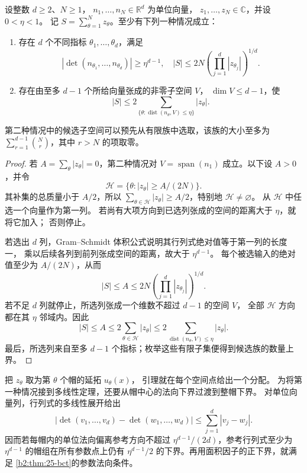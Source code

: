 \begin{lemma}[有限帽的方向分配]\label{b2:lem:25-finite-cap-allocation}
设整数 \(d\geq2\)、\(N\geq1\)，
\(n_1,\ldots,n_N\in\mathbb R^d\) 为单位向量，
\(z_1,\ldots,z_N\in\mathbb C\)，并设 \(0<\eta<1\)。
记 \(S=\sum_{\theta=1}^Nz_\theta\)。至少有下列一种情况成立：
\begin{enumerate}
\item\label{b2:item:25-cap-transverse}存在 \(d\) 个不同指标 \(\theta_1,\ldots,\theta_d\)，满足
\[
 |\det(n_{\theta_1},\ldots,n_{\theta_d})|
 \geq\eta^{d-1},\quad
 |S|\leq2N
 \left(\prod_{j=1}^d|z_{\theta_j}|\right)^{1/d}.
\]
\item\label{b2:item:25-cap-cluster}存在由至多 \(d-1\) 个所给向量张成的非零子空间 \(V\)，
\(\dim V\leq d-1\)，使
\[
 |S|\leq
 2\sum_{\{\theta:\operatorname{dist}(n_\theta,V)\leq\eta\}}
 |z_\theta|.
\]
\end{enumerate}
第二种情况中的候选子空间可以预先从有限族中选取，该族的大小至多为
\(\sum_{r=1}^{d-1}\binom Nr\)，其中 \(r>N\) 的项取零。
\end{lemma}
\begin{proof}
若 \(A=\sum_\theta|z_\theta|=0\)，第二种情况对
\(V=\operatorname{span}(n_1)\) 成立。以下设 \(A>0\)，并令
\[
 \mathcal H=\{\theta:|z_\theta|\geq A/(2N)\}.
\]
其补集的总质量小于 \(A/2\)，所以
\(\sum_{\theta\in\mathcal H}|z_\theta|\geq A/2\)，特别地
\(\mathcal H\ne\varnothing\)。
从 \(\mathcal H\) 中任选一个向量作为第一列。
若尚有大项方向到已选列张成的空间的距离大于 \(\eta\)，就将它加入；
否则停止。

若选出 \(d\) 列，Gram--Schmidt 体积公式说明其行列式绝对值等于第一列的长度一，
乘以后续各列到前列张成空间的距离，故大于 \(\eta^{d-1}\)。
每个被选输入的绝对值至少为 \(A/(2N)\)，从而
\[
 |S|\leq A
 \leq2N\left(\prod_{j=1}^d|z_{\theta_j}|\right)^{1/d}.
\]
若不足 \(d\) 列就停止，所选列张成一个维数不超过 \(d-1\) 的空间 \(V\)，
全部 \(\mathcal H\) 方向都在其 \(\eta\) 邻域内。因此
\[
 |S|\leq A\leq
 2\sum_{\theta\in\mathcal H}|z_\theta|
 \leq2\sum_{\operatorname{dist}(n_\theta,V)\leq\eta}|z_\theta|.
\]
最后，所选列来自至多 \(d-1\) 个指标；枚举这些有限子集便得到候选族的数量上界。
\end{proof}

把 \(z_\theta\) 取为第 \(\theta\) 个帽的延拓 \(u_\theta(x)\)，
引理就在每个空间点给出一个分配。
为将第一种情况接到多线性定理，还要从帽中心的法向下界过渡到整帽下界。
对单位向量列，行列式的多线性展开给出
\[
 |\det(v_1,\ldots,v_d)-\det(w_1,\ldots,w_d)|
 \leq\sum_{j=1}^d|v_j-w_j|.
\]
因而若每帽内的单位法向偏离参考方向不超过
\(\eta^{d-1}/(2d)\)，参考行列式至少为 \(\eta^{d-1}\) 的帽组在所有参数点上仍有
\(\eta^{d-1}/2\) 的下界。再用面积因子的正下界，就满足
\cref{b2:thm:25-bct}的参数法向条件。


